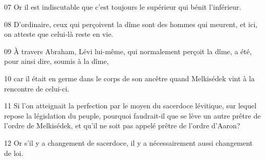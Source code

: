 
07 Or il est indiscutable que c’est toujours le supérieur qui bénit l’inférieur.

08 D’ordinaire, ceux qui perçoivent la dîme sont des hommes qui meurent, et ici, on atteste que celui-là reste en vie.

09 À travers Abraham, Lévi lui-même, qui normalement perçoit la dîme, a été, pour ainsi dire, soumis à la dîme,

10 car il était en germe dans le corps de son ancêtre quand Melkisédek vint à la rencontre de celui-ci.

11 Si l’on atteignait la perfection par le moyen du sacerdoce lévitique, sur lequel repose la législation du peuple, pourquoi faudrait-il que se lève un autre prêtre de l’ordre de Melkisédek, et qu’il ne soit pas appelé prêtre de l’ordre d’Aaron?

12 Or s’il y a changement de sacerdoce, il y a nécessairement aussi changement de loi.